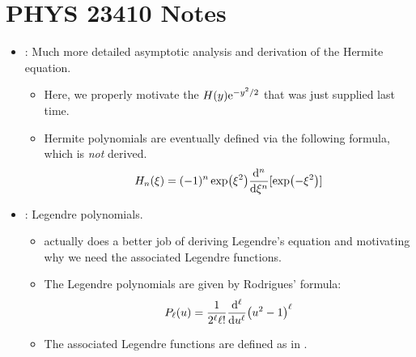 \documentclass[../finalProject.tex]{subfiles}
\begin{document}
\section*{PHYS 23410 Notes}
\begin{itemize}
    \item {}\textcite[34-37]{bib:PHYS23410Notes}: Much more detailed asymptotic analysis and derivation of the Hermite equation.
    \begin{itemize}
        \item Here, we properly motivate the $H(y)\e[-y^2/2]$ that was just supplied last time.
        \item Hermite polynomials are eventually defined via the following formula, which is \emph{not} derived.
        \begin{equation*}
            H_n(\xi) = (-1)^n\exp(\xi^2)\dv[n]{\xi}[\exp(-\xi^2)]
        \end{equation*}
    \end{itemize}
    \item \textcite[65-66]{bib:PHYS23410Notes}: Legendre polynomials.
    \begin{itemize}
        \item \textcite{bib:CHEM26100Notes} actually does a better job of deriving Legendre's equation and motivating why we need the associated Legendre functions.
        \item The Legendre polynomials are given by Rodrigues' formula:
        \begin{equation*}
            P_\ell(u) = \frac{1}{2^\ell\ell!}\dv[\ell]{u}(u^2-1)^\ell
        \end{equation*}
        \item The associated Legendre functions are defined as in \textcite{bib:CHEM26100Notes}.
    \end{itemize}
\end{itemize}
\end{document}
